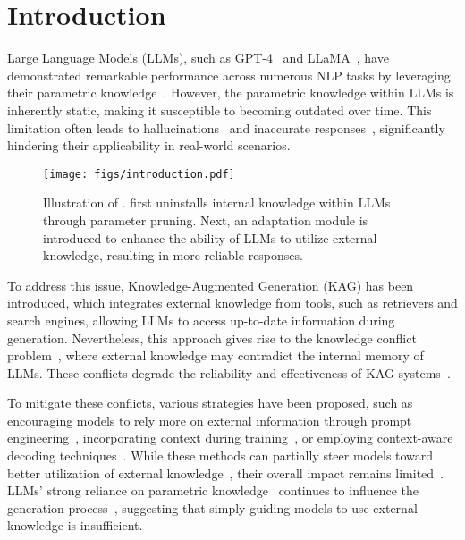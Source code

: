 \section{Introduction}
Large Language Models (LLMs), such as GPT-4~\cite{openai2023gpt} and LLaMA~\cite{touvron2023llama}, have demonstrated remarkable performance across numerous NLP tasks by leveraging their parametric knowledge~\cite{wei2022emergent,zhao2023survey}. However, the parametric knowledge within LLMs is inherently static, making it susceptible to becoming outdated over time. This limitation often leads to hallucinations~\cite{huang2023survey,elazar2021measuring} and inaccurate responses~\cite{ji2023survey,shuster2021retrieval}, significantly hindering their applicability in real-world scenarios.


\begin{figure}[!t]
    \centering
    \texttt{[image: figs/introduction.pdf]}
  \caption{Illustration of \method{}. \method{} first uninstalls internal knowledge within LLMs through parameter pruning. Next, an adaptation module is introduced to enhance the ability of LLMs to utilize external knowledge, resulting in more reliable responses.}
  \label{fig:intro}
\end{figure}


To address this issue, Knowledge-Augmented Generation (KAG) has been introduced, which integrates external knowledge from tools, such as retrievers and search engines, allowing LLMs to access up-to-date information during generation. Nevertheless, this approach gives rise to the knowledge conflict problem~\cite{longpre2021entity,xu2024knowledge}, where external knowledge may contradict the internal memory of LLMs. These conflicts degrade the reliability and effectiveness of KAG systems~\cite{yu2022generate,chen2023benchmarking}. 

To mitigate these conflicts, various strategies have been proposed, such as encouraging models to rely more on external information through prompt engineering~\cite{yu2023chain, zhou2023context}, incorporating context during training~\cite{lin2023ra, li2022large}, or employing context-aware decoding techniques~\cite{huang2025dynamic, yuan2024discerning, wang2024adacad, bi2024context}. While these methods can partially steer models toward better utilization of external knowledge~\cite{li2022large}, their overall impact remains limited~\cite{goyal2024context,bi2024context}. LLMs' strong reliance on parametric knowledge~\cite{tan2024blinded,longpre2021entity} continues to influence the generation process~\cite{tao2024context}, suggesting that simply guiding models to use external knowledge is insufficient.


